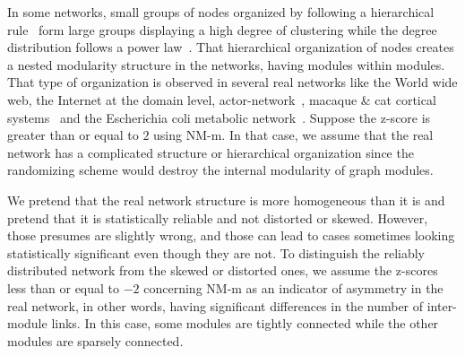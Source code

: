 In some networks, small groups of nodes organized by following a hierarchical rule~\cite{BARABASI2001559} form large groups displaying a high degree of clustering while the degree distribution follows a power law~\cite{Barabasi2003}. That hierarchical organization of nodes creates a nested modularity structure in the networks, having modules within modules. That type of organization is observed in several real networks like the World wide web, the Internet at the domain level, actor-network~\cite{Barabasi2003}, macaque \& cat cortical systems~\cite{Young2000} and the Escherichia coli metabolic network~\cite{Ravasz1551}. Suppose the z-score is greater than or equal to $2$ using NM-m. In that case, we assume that the real network has a complicated structure or hierarchical organization since the randomizing scheme would destroy the internal modularity of graph modules. 

We pretend that the real network structure is more homogeneous than it is and pretend that it is statistically reliable and not distorted or skewed. However, those presumes are slightly wrong, and those can lead to cases sometimes looking statistically significant even though they are not. To distinguish the reliably distributed network from the skewed or distorted ones, we assume the z-scores less than or equal to $-2$ concerning NM-m as an indicator of asymmetry in the real network, in other words, having significant differences in the number of inter-module links. In this case, some modules are tightly connected while the other modules are sparsely connected.


